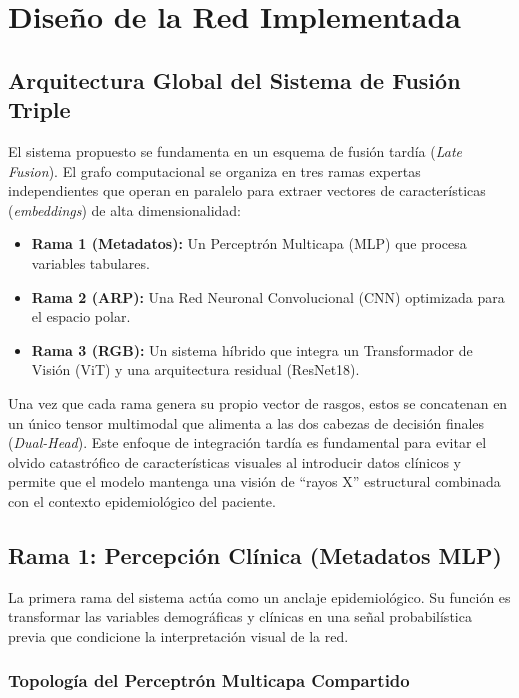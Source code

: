 \chapter{Diseño de la Red Implementada}

\section{Arquitectura Global del Sistema de Fusión Triple}

El sistema propuesto se fundamenta en un esquema de fusión tardía (\textit{Late Fusion}). El grafo computacional se organiza en tres ramas expertas independientes que operan en paralelo para extraer vectores de características (\textit{embeddings}) de alta dimensionalidad:

\begin{itemize}
	\item \textbf{Rama 1 (Metadatos):} Un Perceptrón Multicapa (MLP) que procesa variables tabulares.
	\item \textbf{Rama 2 (ARP):} Una Red Neuronal Convolucional (CNN) optimizada para el espacio polar.
	\item \textbf{Rama 3 (RGB):} Un sistema híbrido que integra un Transformador de Visión (ViT) y una arquitectura residual (ResNet18).
\end{itemize}

Una vez que cada rama genera su propio vector de rasgos, estos se concatenan en un único tensor multimodal que alimenta a las dos cabezas de decisión finales (\textit{Dual-Head}). Este enfoque de integración tardía es fundamental para evitar el olvido catastrófico de características visuales al introducir datos clínicos y permite que el modelo mantenga una visión de ``rayos X'' estructural combinada con el contexto epidemiológico del paciente.

\section{Rama 1: Percepción Clínica (Metadatos MLP)}

La primera rama del sistema actúa como un anclaje epidemiológico. Su función es transformar las variables demográficas y clínicas en una señal probabilística previa que condicione la interpretación visual de la red.

\subsection{Topología del Perceptrón Multicapa Compartido}


